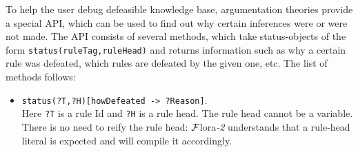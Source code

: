 \documentclass[11pt]{article}
\newcommand{\FLORA}{{\mbox{\sc ${\cal F}${lora}\rm\emph{-2}}}\xspace}
\newcommand{\FLSYSTEM}{\FLORA}
\begin{document}
To help the user debug defeasible knowledge base, argumentation
theories provide a special API, which can be used to find out
why certain inferences were or were not made.
The API consists of several methods, which take status-objects of the form
{\tt status(ruleTag,ruleHead)} and returns information such as why a certain
rule was defeated, which rules are defeated by the given one, etc.
The list of methods follows:
\begin{itemize}
\item  {\tt status(?T,?H)[howDefeated -> ?Reason]}.\\
  Here {\tt ?T} is a rule Id and {\tt ?H} is a rule head. The rule head
  cannot be a variable. There is no need to reify the rule head: \FLSYSTEM
  understands that a rule-head literal is expected and will compile it
  accordingly.  


\end{itemize}
\end{document}
